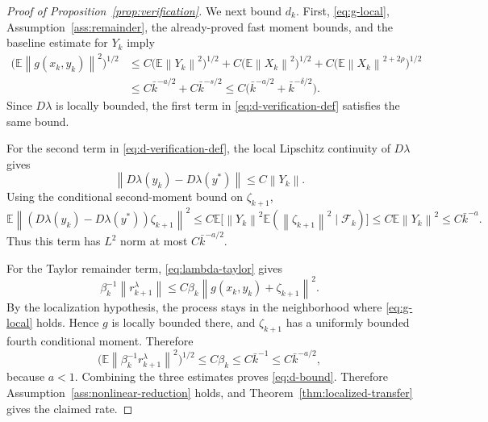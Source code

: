 \documentclass{article}
\newcommand{\E}{\mathbb{E}}
\newcommand{\norm}[1]{\left\lVert #1\right\rVert}
\begin{document}
\begin{proof}[Proof of Proposition~\ref{prop:verification}]
We next bound $d_k$. First, \eqref{eq:g-local}, Assumption~\ref{ass:remainder}, the already-proved fast moment bounds, and the baseline estimate for $Y_k$ imply
\begin{align*}
  \big(\E\norm{g(x_k,y_k)}^2\big)^{1/2}
  &\le C\big(\E\norm{Y_k}^2\big)^{1/2}
       +C\big(\E\norm{X_k}^2\big)^{1/2}
       +C\big(\E\norm{X_k}^{2+2\rho}\big)^{1/2}\\
  &\le C\bar k^{-a/2}+C\bar k^{-s/2}
  \le C\big(\bar k^{-a/2}+\bar k^{-\delta/2}\big). \label{eq:g-l2-verification}
\end{align*}
Since $D\lambda$ is locally bounded, the first term in \eqref{eq:d-verification-def} satisfies the same bound.

For the second term in \eqref{eq:d-verification-def}, the local Lipschitz continuity of $D\lambda$ gives
\[
  \norm{D\lambda(y_k)-D\lambda(y^*)}\le C\norm{Y_k}.
\]
Using the conditional second-moment bound on $\zeta_{k+1}$,
\[
  \E\norm{(D\lambda(y_k)-D\lambda(y^*))\zeta_{k+1}}^2
  \le C\E\big[\norm{Y_k}^2\E(\norm{\zeta_{k+1}}^2\mid\mathcal F_k)\big]
  \le C\E\norm{Y_k}^2
  \le C\bar k^{-a}.
\]
Thus this term has $L^2$ norm at most $C\bar k^{-a/2}$.

For the Taylor remainder term, \eqref{eq:lambda-taylor} gives
\[
  \beta_k^{-1}\norm{r^\lambda_{k+1}}
  \le C\beta_k\norm{g(x_k,y_k)+\zeta_{k+1}}^2.
\]
By the localization hypothesis, the process stays in the neighborhood where \eqref{eq:g-local} holds. Hence $g$ is locally bounded there, and $\zeta_{k+1}$ has a uniformly bounded fourth conditional moment. Therefore
\[
  \big(\E\norm{\beta_k^{-1}r^\lambda_{k+1}}^2\big)^{1/2}
  \le C\beta_k
  \le C\bar k^{-1}
  \le C\bar k^{-a/2},
\]
because $a<1$. Combining the three estimates proves \eqref{eq:d-bound}. Therefore Assumption~\ref{ass:nonlinear-reduction} holds, and Theorem~\ref{thm:localized-transfer} gives the claimed rate.
\end{proof}
\end{document}
